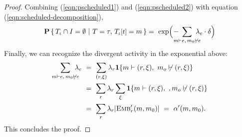 \begin{proof}
  Combining (\ref{eqn:pscheduled1}) and (\ref{eqn:pscheduled2}) with
  equation (\ref{eqn:scheduled-decomposition}),
  \begin{equation*}
    \CProb{ \ATRAJ{} \cap I = \emptyset }
    { T=\tau,\,\TSTATE{t}{\ATRAJ{}} = m }
    = \ 
    \exp{ \! \Big ( \!- \hspace{-1em} \sum_{m \vdash e, \, m_0 \not\vdash
        e} \hspace{-0.9em} \lambda_e \cdot \delta \Big ) }
  \end{equation*}
  Finally, we can recognize the divergent activity in the exponential
  above: \vskip 0.0cm
  \begin{equation*}
    \begin{aligned}
      \sum_{m \vdash e, \, m_0 \not\vdash e} \hspace{-0.8em} \lambda_e
      \
      &= \ \sum_{(r, \xi)} \lambda_r \textbf{1}\{ m \vdash (r, \xi),\ m_o \not\vdash (r, \xi) \} \\
      &= \ \sum_r \lambda_r\sum_\xi \textbf{1}\{ m \vdash (r, \xi),\ ,m_o \not\vdash (r, \xi) \} \\
      &= \ \sum_r \lambda_r |{\textsc{Emb}}'_{r}(m, m_0)| \ = \ \alpha'(m, m_0).
    \end{aligned}
  \end{equation*}
  \vskip 0.2cm
  \noindent This concludes the proof.
\end{proof}
